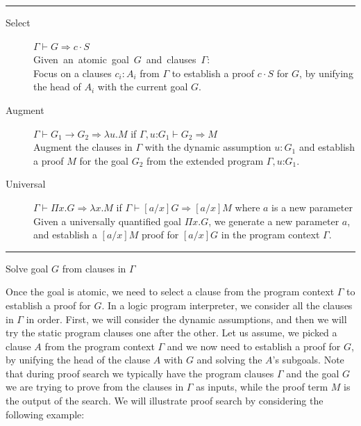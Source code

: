 \documentclass{acmconf}
\newcommand{\figfoot}{\vspace{1ex}\hrule}
\newcommand{\fighead}{\hrule\vspace{1.5ex}}
\newcommand{\vd}{\vdash}
\newcommand{\arrow}{\rightarrow}
\newcommand{\oftp}{\mathord{:}}
\begin{document}
\begin{table}[h]
\fighead
\begin{center}
\begin{small}
\begin{description}
\item[Select] $\Gamma \vd  G \Rightarrow c\cdot S$ \\
    \mbox{Given an atomic goal $G$ and clauses $\Gamma$:}\hfill\\
     Focus on a clauses $c_i : A_i$ from $\Gamma$ to establish a proof
     $c\cdot S$ for $G$, by unifying the head of $A_i$ with the current
     goal $G$. 

\item[Augment] $\Gamma \vd  G_1 \arrow G_2 \Rightarrow \lambda u. M$ if $\Gamma,
  u\oftp G_1 \vd G_2 \Rightarrow M$ \\
Augment the clauses in $\Gamma$ with the dynamic assumption $u : G_1$ and
establish a proof $M$ for the goal $G_2$ from the extended program
$\Gamma, u \oftp G_1$. 
\item[Universal] $\Gamma \vd  \Pi x. G \Rightarrow \lambda x. M$ if $\Gamma \vd
  [a/x]G\Rightarrow [a/x]M$ where $a$ is a new parameter\\
Given a universally quantified goal $\Pi x. G$, we generate a new parameter $a$, and establish a $[a/x]M$ proof  for $[a/x]G$ in the program context $\Gamma$.
\end{description}
\end{small}    
\end{center}
\figfoot
\caption{\label{fig:solve}Solve goal $G$ from clauses in $\Gamma$}
\end{table}

Once the goal is atomic, we need to select a clause from the
program context $\Gamma$ to establish a proof for $G$. In a logic
program interpreter, we consider all the clauses in $\Gamma$ in order. 
First, we will consider the dynamic assumptions, and then we will try
the static program clauses one after the other. 
Let us assume, we picked a clause $A$ from the program context
$\Gamma$ and we now need to establish a proof for $G$, by unifying the
head of the clause $A$ with $G$ and solving the $A$'s subgoals.
Note that during proof search we typically have the program
clauses $\Gamma$ and the goal $G$ we are trying to prove from the
clauses in $\Gamma$ as inputs, while the proof term $M$ is the output
of the search. We will illustrate proof search by considering the
following example:  
\end{document}
